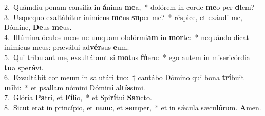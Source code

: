 {2.~}Quámdiu ponam consília in \textbf{á}nima \textbf{me}a,~* dolórem in corde \textbf{me}o per \textbf{di}em?\\
{3.~}Usquequo exaltábitur inimícus \textbf{me}us \textbf{su}per me?~* réspice, et exáudi me, Dómine, \textbf{De}us \textbf{me}us.\\
{4.~}Illúmina óculos meos ne umquam obdórmi\textbf{am} in \textbf{mor}te:~* nequándo dicat inimícus meus: præválui ad\textbf{vér}sus \textbf{e}um.\\
{5.~}Qui tríbulant me, exsultábunt si \textbf{mo}tus \textbf{fú}ero:~* ego autem in misericórdia \textbf{tu}a spe\textbf{rá}vi.\\
{6.~}Exsultábit cor meum in salutári tuo:~† cantábo Dómino qui bona \textbf{trí}buit \textbf{mi}hi:~* et psallam nómini Dómi\textbf{ni} al\textbf{tís}simi.\\
{7.~}Glória \textbf{Pa}tri, et \textbf{Fí}lio,~* et Spi\textbf{rí}tui \textbf{San}cto.\\
{8.~}Sicut erat in princípio, et \textbf{nunc}, et \textbf{sem}per,~* et in sǽcula sæcu\textbf{ló}rum. \textbf{A}men.\\
